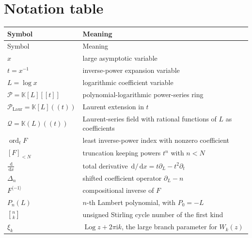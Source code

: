 \documentclass[11pt]{article}
\theoremstyle{pltheorem}
\newcommand{\K}{\mathbb K}
\newcommand{\PL}{\mathscr P}
\newcommand{\PLL}{\mathscr P_{\mathrm{Laur}}}
\newcommand{\QPL}{\mathscr Q}
\newcommand{\dd}{\,\mathrm d}
\newcommand{\ii}{\mathrm i}
\newcommand{\ordt}{\operatorname{ord}_t}
\newcommand{\Log}{\operatorname{Log}}
\newcommand{\rev}{\langle-1\rangle}
\newcommand{\stirlingone}[2]{\genfrac{[}{]}{0pt}{}{#1}{#2}}
\newcommand{\D}{\frac{\dd}{\dd x}}
\begin{document}
\section{Notation table}
\label{app:notation}

\begin{longtable}{@{}p{}p{}@{}}
\toprule
Symbol & Meaning\\
\midrule
\endfirsthead
\toprule
Symbol & Meaning\\
\midrule
\endhead
\(x\) & large asymptotic variable\\
\(t=x^{-1}\) & inverse-power expansion variable\\
\(L=\log x\) & logarithmic coefficient variable\\
\(\PL=\K[L][[t]]\) & polynomial-logarithmic power-series ring\\
\(\PLL=\K[L]((t))\) & Laurent extension in \(t\)\\
\(\QPL=\K(L)((t))\) & Laurent-series field with rational functions of \(L\) as coefficients\\
\(\ordt F\) & least inverse-power index with nonzero coefficient\\
\([F]_{<N}\) & truncation keeping powers \(t^n\) with \(n<N\)\\
\(\D\) & total derivative \(\dd/\dd x=t\partial_L-t^2\partial_t\)\\
\(\Delta_n\) & shifted coefficient operator \(\partial_L-n\)\\
\(F^{\rev}\) & compositional inverse of \(F\)\\
\(P_n(L)\) & \(n\)-th Lambert polynomial, with \(P_0=-L\)\\
\(\stirlingone{n}{k}\) & unsigned Stirling cycle number of the first kind\\
\(\xi_k\) & \(\Log z+2\pi\ii k\), the large branch parameter for \(W_k(z)\)\\
\bottomrule
\end{longtable}
\end{document}
